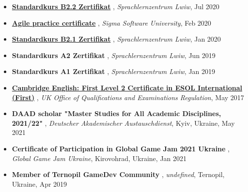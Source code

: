 \documentclass[letterpaper,10pt]{article}
\newcommand{\titleItem}[1]{
  \textbf{#1}
}
\begin{document}
\begin{itemize}[leftmargin=0.15in, label={}]
    \item
			\titleItem{\href{https://drive.google.com/file/d/1RlLSvM_3e2ge_CuGSYeGQfTOlzlmEYdH/view?usp=sharing}{{Standardkurs B2.2 Zertifikat}}}, \emph{Sprachlernzentrum Lwiw}, Jul 2020
			\vspace{-9pt}
		
    \item
			\titleItem{\href{https://drive.google.com/file/d/1LTYpV6Q1HNzGcMxh6HO4tlEtwELc0Pta/view?usp=sharing}{{Agile practice certificate}}}, \emph{Sigma Software University}, Feb 2020
			\vspace{-9pt}
		
    \item
			\titleItem{\href{https://drive.google.com/open?id=17kmCOkC1snH8HCPZ8kAo2MOrqXi1my6P}{{Standardkurs B2.1 Zertifikat}}}, \emph{Sprachlernzentrum Lwiw}, Jan 2020
			\vspace{-9pt}
		
    \item
			\titleItem{Standardkurs A2 Zertifikat}, \emph{Sprachlernzentrum Lwiw}, Jun 2019
			\vspace{-9pt}
		
    \item
			\titleItem{Standardkurs A1 Zertifikat}, \emph{Sprachlernzentrum Lwiw}, Jan 2019
			\vspace{-9pt}
		
    \item
			\titleItem{\href{https://drive.google.com/file/d/1qcIYSFNIVZ2rZL4G9o46xJTBmrIXxtuM/view?usp=sharing}{{Cambridge English: First Level 2 Certificate in ESOL International (First)}}}, \emph{UK Office of Qualifications and Examinations Regulation}, May 2017
			\vspace{-9pt}
		
\par\hrulefill

    \item
			\titleItem{DAAD scholar "Master Studies for All Academic Disciplines, 2021/22"}, \emph{Deutscher Akademischer Austauschdienst}, {Kyiv, Ukraine}, May 2021
			\vspace{-9pt}
		
    \item
			\titleItem{Certificate of Participation in Global Game Jam 2021 Ukraine}, \emph{Global Game Jam Ukraine}, {Kirovohrad, Ukraine}, Jan 2021
			\vspace{-9pt}
		
    \item
			\titleItem{Member of Ternopil GameDev Community}, \emph{undefined}, {Ternopil, Ukraine}, Apr 2019
			\vspace{-9pt}
		

\end{itemize}
\end{document}
